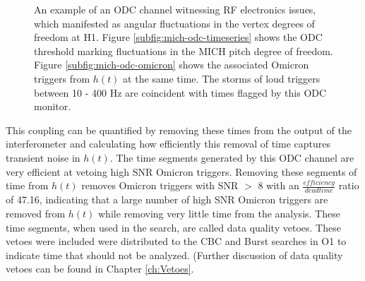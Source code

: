 \begin{figure}[ht!]%

\caption[ODC threshold on MICH pitch]{%
         An example of an ODC channel witnessing RF electronics issues, which %
         manifested as angular fluctuations in the vertex degrees of freedom %
         at H1. Figure \ref{subfig:mich-odc-timeseries} shows the ODC threshold %
         marking fluctuations in the MICH pitch degree of freedom. Figure %
         \ref{subfig:mich-odc-omicron} shows the associated Omicron triggers from %
         $h(t)$ at the same time. The storms of loud triggers between 10 - 400 Hz %
         are coincident with times flagged by this ODC monitor.}
\end{figure}\label{fig:mich-odc-example}

This coupling can be quantified by removing these times from the output of the 
interferometer and calculating how efficiently this removal of time captures 
transient noise in $h(t)$. The 
time segments generated by this ODC channel are very efficient at vetoing high SNR 
Omicron triggers. Removing these segments of time from $h(t)$ removes Omicron triggers 
with SNR $>$ 8 with an $\frac{efficiency}{deadtime}$ ratio of 47.16, indicating that 
a large number of high SNR Omicron triggers are removed from $h(t)$ while removing 
very little time from the analysis. These 
time segments, when used in the search, are called data quality vetoes. These vetoes 
were included were distributed to the CBC and Burst searches in O1 to indicate time 
that should not be analyzed. (Further discussion of data quality vetoes can be found 
in Chapter \ref{ch:Vetoes}.

